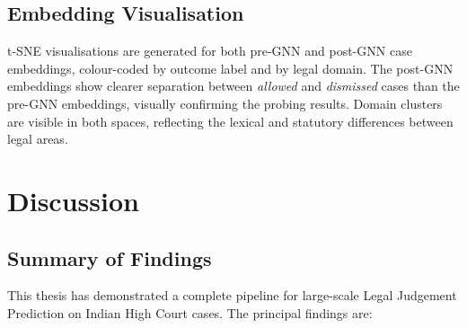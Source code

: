 \documentclass[12pt,a4paper]{report}
\begin{document}
\section{Embedding Visualisation}
\label{sec:tsne}

t-SNE visualisations are generated for both pre-GNN and post-GNN case embeddings, colour-coded by outcome label and by legal domain. The post-GNN embeddings show clearer separation between \textit{allowed} and \textit{dismissed} cases than the pre-GNN embeddings, visually confirming the probing results. Domain clusters are visible in both spaces, reflecting the lexical and statutory differences between legal areas.

\chapter{Discussion}
\label{chap:discussion}

\section{Summary of Findings}
\label{sec:findings_summary}

This thesis has demonstrated a complete pipeline for large-scale Legal Judgement Prediction on Indian High Court cases. The principal findings are:
\end{document}
